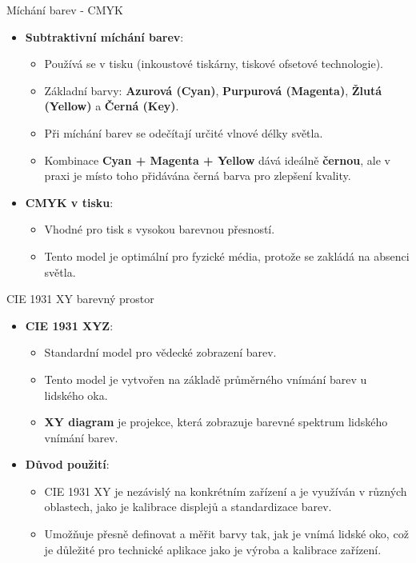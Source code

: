 \documentclass[aspectratio=43]{beamer}
\begin{document}
\begin{frame}{Míchání barev - CMYK}
    \begin{itemize}
        \item \textbf{Subtraktivní míchání barev}:
        \begin{itemize}
            \item Používá se v tisku (inkoustové tiskárny, tiskové ofsetové technologie).
            \item Základní barvy: \textbf{Azurová (Cyan)}, \textbf{Purpurová (Magenta)}, \textbf{Žlutá (Yellow)} a \textbf{Černá (Key)}.
            \item Při míchání barev se odečítají určité vlnové délky světla.
            \item Kombinace \textbf{Cyan + Magenta + Yellow} dává ideálně \textbf{černou}, ale v praxi je místo toho přidávána černá barva pro zlepšení kvality.
        \end{itemize}
        \item \textbf{CMYK v tisku}: 
        \begin{itemize}
            \item Vhodné pro tisk s vysokou barevnou přesností.
            \item Tento model je optimální pro fyzické média, protože se zakládá na absenci světla.
        \end{itemize}
    \end{itemize}
\end{frame}

\begin{frame}{CIE 1931 XY barevný prostor}
    \begin{itemize}
        \item \textbf{CIE 1931 XYZ}:
        \begin{itemize}
            \item Standardní model pro vědecké zobrazení barev.
            \item Tento model je vytvořen na základě průměrného vnímání barev u lidského oka.
            \item \textbf{XY diagram} je projekce, která zobrazuje barevné spektrum lidského vnímání barev.
        \end{itemize}
        \item \textbf{Důvod použití}:
        \begin{itemize}
            \item CIE 1931 XY je nezávislý na konkrétním zařízení a je využíván v různých oblastech, jako je kalibrace displejů a standardizace barev.
            \item Umožňuje přesně definovat a měřit barvy tak, jak je vnímá lidské oko, což je důležité pro technické aplikace jako je výroba a kalibrace zařízení.
        \end{itemize}
    \end{itemize}
\end{frame}
\end{document}
